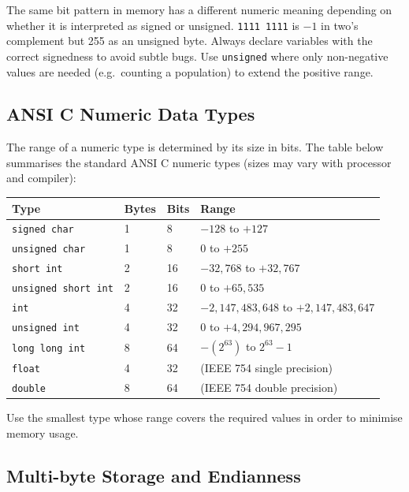 \documentclass[11pt, a4paper, notitlepage]{report}
\theoremstyle{definition}
\theoremstyle{remark}
\theoremstyle{definition}
\begin{document}
\begin{warning}[title={Signed vs.\ Unsigned Interpretation}]
The same bit pattern in memory has a different numeric meaning depending on whether it is interpreted as signed or unsigned. \texttt{1111 1111} is $-1$ in two's complement but 255 as an unsigned byte. Always declare variables with the correct signedness to avoid subtle bugs. Use \texttt{unsigned} where only non-negative values are needed (e.g.\ counting a population) to extend the positive range.
\end{warning}

\subsection{ANSI C Numeric Data Types}

The range of a numeric type is determined by its size in bits. The table below summarises the standard ANSI C numeric types (sizes may vary with processor and compiler):

\begin{center}
\begin{tabularx}{\textwidth}{lllX}
\toprule
\textbf{Type} & \textbf{Bytes} & \textbf{Bits} & \textbf{Range} \\
\midrule
\texttt{signed char} & 1 & 8 & $-128$ to $+127$ \\
\texttt{unsigned char} & 1 & 8 & 0 to $+255$ \\
\texttt{short int} & 2 & 16 & $-32{,}768$ to $+32{,}767$ \\
\texttt{unsigned short int} & 2 & 16 & 0 to $+65{,}535$ \\
\texttt{int} & 4 & 32 & $-2{,}147{,}483{,}648$ to $+2{,}147{,}483{,}647$ \\
\texttt{unsigned int} & 4 & 32 & 0 to $+4{,}294{,}967{,}295$ \\
\texttt{long long int} & 8 & 64 & $-(2^{63})$ to $2^{63}-1$ \\
\texttt{float} & 4 & 32 & (IEEE 754 single precision) \\
\texttt{double} & 8 & 64 & (IEEE 754 double precision) \\
\bottomrule
\end{tabularx}
\end{center}

Use the smallest type whose range covers the required values in order to minimise memory usage.

\subsection{Multi-byte Storage and Endianness}
\end{document}
